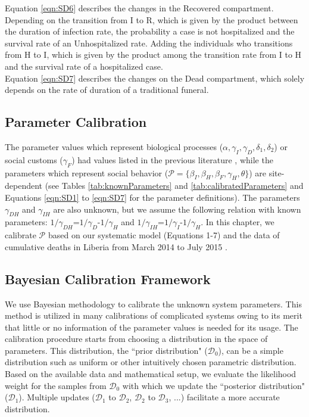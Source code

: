 Equation \ref{eqn:SD6} describes the changes in the Recovered compartment. Depending on the transition from I to R, which is given by the product between the duration of infection rate, the probability a case is not hospitalized and the survival rate of an Unhospitalized rate. Adding  the individuals who transitions from H to I, which is given by the product among the transition rate from I to H and the survival rate of a hospitalized case.\\

Equation \ref{eqn:SD7} describes the changes on the Dead compartment, which solely depends on the rate of duration of a traditional funeral.\\





\subsection{Parameter Calibration}

The parameter values which represent biological processes ($\alpha, \gamma_{I}, \gamma_{D}, \delta_{1}, \delta_{2}$) or social customs ($\gamma_{F}$) had values listed in the previous literature \cite{Poletto2014, Webb2015}, while the parameters which represent social behavior ($\mathcal{P}=\{\beta_{I}, \beta_{H}, \beta_{F}, \gamma_{H}, \theta\}$) are site-dependent (see Tables \ref{tab:knownParameters} and \ref{tab:calibratedParameters} and Equations \ref{eqn:SD1} to \ref{eqn:SD7} for the parameter definitions). The parameters $\gamma_{DH}$ and $\gamma_{IH}$ are also unknown, but we assume the following relation with known parameters: $1/\gamma_{DH}$=$1/\gamma_{D}$-$1/\gamma_{H}$ and $1/\gamma_{IH}$=$1/\gamma_{I}$-$1/\gamma_{H}$. In this chapter, we calibrate $\mathcal{P}$ based on our systematic model (Equations 1-7) and the data of cumulative deaths in Liberia from March 2014 to July 2015 \cite{CDCData}.


\subsection{Bayesian Calibration Framework}
We use Bayesian methodology to calibrate the unknown system parameters. This method is utilized in many calibrations of complicated systems owing to its merit that little or no information of the parameter values is needed for its usage. The calibration procedure starts from choosing a distribution in the space of parameters. This distribution, the ``prior distribution" ($\mathcal{D}_0$), can be a simple distribution such as uniform or other intuitively chosen parametric distribution. Based on the available data and mathematical setup, we evaluate the likelihood weight for the samples from $\mathcal{D}_0$ with which we update the ``posterior distribution" ($\mathcal{D}_1$). Multiple updates ($\mathcal{D}_1$ to $\mathcal{D}_2$, $\mathcal{D}_2$ to $\mathcal{D}_3$, ...) facilitate a more accurate distribution.

